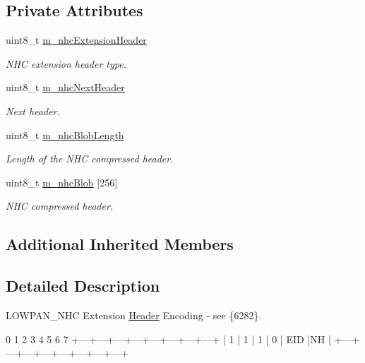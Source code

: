 \subsection*{Private Attributes}
\begin{DoxyCompactItemize}
\item 
uint8\+\_\+t \hyperlink{classns3_1_1SixLowPanNhcExtension_a4fe43caeba3a84f5c51ebe9d0948f947}{m\+\_\+nhc\+Extension\+Header}
\begin{DoxyCompactList}\small\item\em N\+HC extension header type. \end{DoxyCompactList}\item 
uint8\+\_\+t \hyperlink{classns3_1_1SixLowPanNhcExtension_a00b5e90b02f8219348b3f262af793817}{m\+\_\+nhc\+Next\+Header}
\begin{DoxyCompactList}\small\item\em Next header. \end{DoxyCompactList}\item 
uint8\+\_\+t \hyperlink{classns3_1_1SixLowPanNhcExtension_ab0a959a135df36e5ad069f0371d84337}{m\+\_\+nhc\+Blob\+Length}
\begin{DoxyCompactList}\small\item\em Length of the N\+HC compressed header. \end{DoxyCompactList}\item 
uint8\+\_\+t \hyperlink{classns3_1_1SixLowPanNhcExtension_a0d528c84835373081b2412458b6a4f78}{m\+\_\+nhc\+Blob} \mbox{[}256\mbox{]}
\begin{DoxyCompactList}\small\item\em N\+HC compressed header. \end{DoxyCompactList}\end{DoxyCompactItemize}
\subsection*{Additional Inherited Members}


\subsection{Detailed Description}
L\+O\+W\+P\+A\+N\+\_\+\+N\+HC Extension \hyperlink{classns3_1_1Header}{Header} Encoding -\/ see \{6282\}. 

\begin{DoxyVerb}   0   1   2   3   4   5   6   7
 +---+---+---+---+---+---+---+---+
 | 1 | 1 | 1 | 0 |    EID    |NH |
 +---+---+---+---+---+---+---+---+
\end{DoxyVerb}
 

